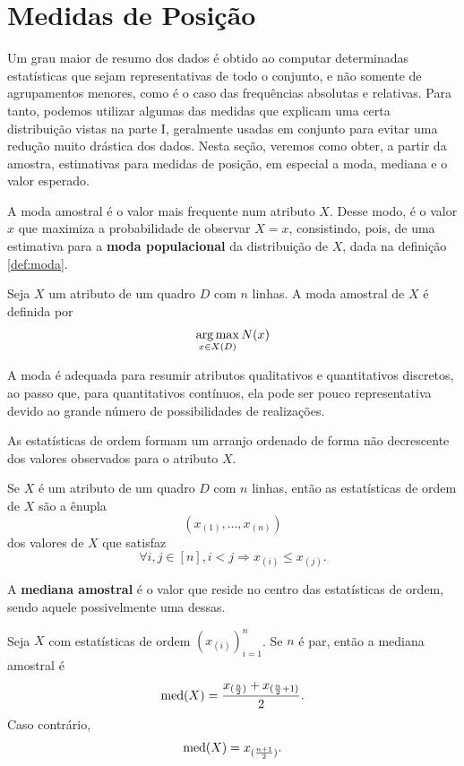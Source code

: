 \section{Medidas de Posição}
\label{sec:medidas de posicao}

Um grau maior de resumo dos dados é obtido ao computar determinadas estatísticas
que sejam representativas de todo o conjunto, e não somente de agrupamentos menores, como
é o caso das frequências absolutas e relativas.
Para tanto, podemos utilizar algumas das medidas que explicam uma certa distribuição
vistas na parte I, geralmente usadas em conjunto para evitar uma redução muito drástica
dos dados.
Nesta seção, veremos como obter, a partir da amostra, estimativas para medidas de posição,
em especial a moda, mediana e o valor esperado.

A moda amostral é o valor mais frequente num atributo $X$.
Desse modo, é o valor $x$ que maximiza a probabilidade de observar $X = x$, consistindo,
pois, de uma estimativa para a \textbf{moda populacional} da distribuição de $X$,
dada na definição \ref{def:moda}.

\begin{def:moda amostral}
Seja $X$ um atributo de um quadro $D$ com $n$ linhas.
A moda amostral de $X$ é definida por
\[
    \operatorname*{arg\,max}_{x \in X(D)} N(x)
\]
\end{def:moda amostral}

A moda é adequada para resumir atributos qualitativos e quantitativos discretos, ao passo
que, para quantitativos contínuos, ela pode ser pouco representativa devido ao grande
número de possibilidades de realizações.

As estatísticas de ordem formam um arranjo ordenado de forma não decrescente dos valores
observados para o atributo $X$.
\begin{def:estatisticas ordem}
Se $X$ é um atributo de um quadro $D$ com $n$ linhas, então as estatísticas de ordem
de $X$ são a ênupla
\[
    (x_{(1)}, \ldots, x_{(n)})
\]
dos valores de $X$ que satisfaz
\[
    \forall i, j \in [n], i < j \Longrightarrow x_{(i)} \le x_{(j)}.
\]
\end{def:estatisticas ordem}
A \textbf{mediana amostral} é o valor que reside no centro das estatísticas de ordem,
sendo aquele possivelmente uma dessas.
\begin{def:mediana amostral}
\label{def:mediana amostral}
Seja $X$ com estatísticas de ordem $(x_{(i)})_{i=1}^n$.
Se $n$ é par, então a mediana amostral é
\[
    \mathrm{med}\!\left(X\right) = \frac{x_{(\frac n 2)} + x_{(\frac{n}{2}+1)}}{2}.
\]
Caso contrário,
\[
    \mathrm{med}\!\left(X\right) = x_{(\frac {n+1} 2 )}.
\]
\end{def:mediana amostral}

